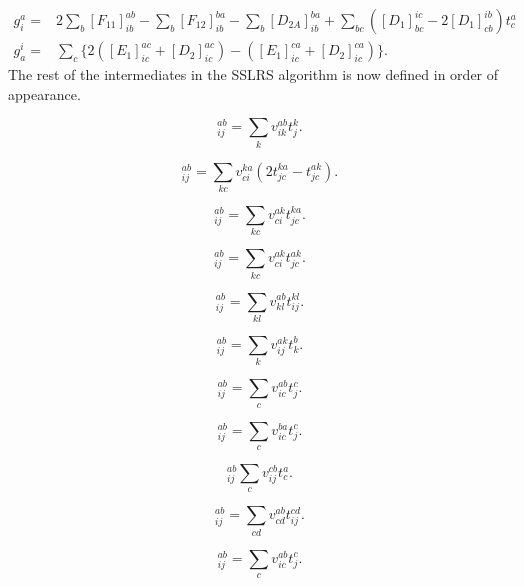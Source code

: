 \begin{align}
g_i^a = & 
2 \sum_b [F_{11}]_{ib}^{ab} 
- \sum_b [F_{12}]_{ib}^{ba}
- \sum_b [D_{2A}]_{ib}^{ba}
+ \sum_{bc} (
[D_1]_{bc}^{ic} - 2[D_1]_{cb}^{ib} ) t_c^a
\\
g_a^i = &
\sum_c \{2([E_1]_{ic}^{ac} + [D_2]_{ic}^{ac} )
- ([E_1]_{ic}^{ca} + [D_2]_{ic}^{ca}) \} .
\end{align}
The rest of the intermediates in the SSLRS algorithm is now defined in order of appearance. 

\begin{equation}
[D_1]_{ij}^{ab} = \sum_k v_{ik}^{ab} t_j^k .
\end{equation}

\begin{equation}
[D_{2A}]_{ij}^{ab} = \sum_{kc}
v_{ci}^{ka} (2 t_{jc}^{ka} - t_{jc}^{ak}) .
\end{equation}

\begin{equation}
[D_{2B}]_{ij}^{ab} = \sum_{kc}
v_{ci}^{ak} t_{jc}^{ka} .
\end{equation}

\begin{equation}
[D_{2C}]_{ij}^{ab} = \sum_{kc}
v_{ci}^{ak} t_{jc}^{ak} .
\end{equation}

\begin{equation}
[B_2]_{ij}^{ab} = \sum_{kl} v_{kl}^{ab} t_{ij}^{kl} .
\end{equation}

\begin{equation}
[E_1^*]_{ij}^{ab} = \sum_k v_{ij}^{ak} t_k^b .
\end{equation}

\begin{equation}
[F_{12}]_{ij}^{ab} = \sum_c
v_{ic}^{ab} t_j^c .
\end{equation}

\begin{equation}
[F_{11}]_{ij}^{ab} = \sum_c v_{ic}^{ba} t_j^c .
\end{equation}

\begin{equation}
[E_{11}]_{ij}^{ab} \sum_c v_{ij}^{cb} t_c^a .
\end{equation}

\begin{equation}
[D_2]_{ij}^{ab} = \sum_{cd} v_{cd}^{ab} t_{ij}^{cd} .
\end{equation}

\begin{equation}
[E_1]_{ij}^{ab} = \sum_c v_{ic}^{ab} t_j^c .
\end{equation}

